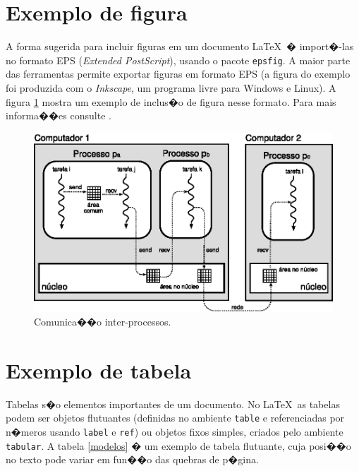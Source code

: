 \documentclass [12pt,oneside] {article}
\begin{document}

\section{Exemplo de figura}

A forma sugerida para incluir figuras em um documento \LaTeX\ � import�-las no formato EPS (\emph{Extended PostScript}), usando o pacote \texttt{epsfig}. A maior parte das ferramentas permite exportar figuras em formato EPS (a figura do exemplo foi produzida com o \emph{Inkscape}, um programa livre para Windows e Linux). A figura \ref{comun-intra-inter} mostra um exemplo de inclus�o de figura nesse formato. Para mais informa��es consulte \cite{goossens93}.

\begin{figure}[!htb]
\centering
\includegraphics[width=12cm]{exemplo.eps}
\caption{Comunica��o inter-processos.}
\label{comun-intra-inter}
\end{figure}


\section{Exemplo de tabela}

Tabelas s�o elementos importantes de um documento. No \LaTeX\ as tabelas podem ser objetos flutuantes (definidas no ambiente \texttt{table} e referenciadas por n�meros usando \texttt{label} e \texttt{ref}) ou objetos fixos simples, criados pelo ambiente \texttt{tabular}. A tabela \ref{modelos} � um exemplo de tabela flutuante, cuja posi��o no texto pode variar em fun��o das quebras de p�gina.
\end{document}
